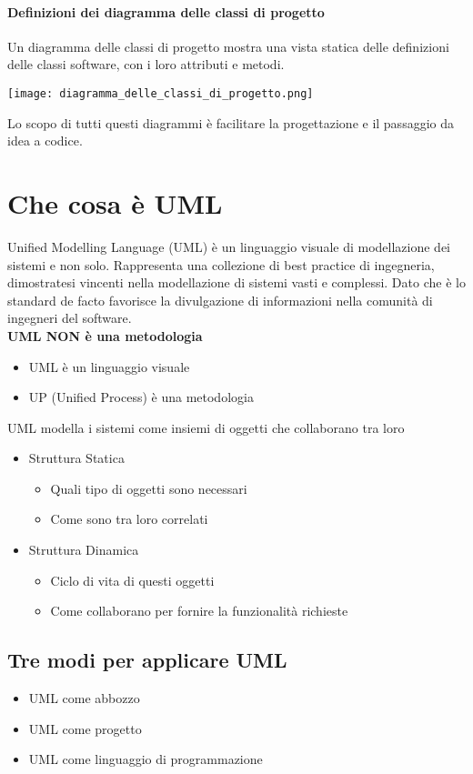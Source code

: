 \paragraph*{Definizioni dei diagramma delle classi di progetto}
Un diagramma delle classi di progetto mostra una vista statica delle definizioni
delle classi software, con i loro attributi e metodi.
\begin{center}
    \texttt{[image: diagramma\_delle\_classi\_di\_progetto.png]}
\end{center}
Lo scopo di tutti questi diagrammi è facilitare la progettazione e il passaggio
da idea a codice.
\section{Che cosa è UML}
Unified Modelling Language (UML) è un linguaggio visuale di modellazione
dei sistemi e non solo.
Rappresenta una collezione di best practice di ingegneria, dimostratesi vincenti
nella modellazione di sistemi vasti e complessi. Dato che è lo standard de facto
favorisce la divulgazione di informazioni nella comunità di ingegneri del software.
\\ \textbf{UML NON è una metodologia}
\begin{itemize}
    \item UML è un linguaggio visuale
    \item UP (Unified Process) è una metodologia
\end{itemize}
UML modella i sistemi come insiemi di oggetti che collaborano tra loro
\begin{itemize}
    \item Struttura Statica \begin{itemize}
        \item Quali tipo di oggetti sono necessari
        \item Come sono tra loro correlati
    \end{itemize}
    \item Struttura Dinamica \begin{itemize}
        \item Ciclo di vita di questi oggetti
        \item Come collaborano per fornire la funzionalità richieste
    \end{itemize}
\end{itemize}
\subsection{Tre modi per applicare UML}
\begin{itemize}
    \item UML come abbozzo
    \item UML come progetto
    \item UML come linguaggio di programmazione
\end{itemize}
